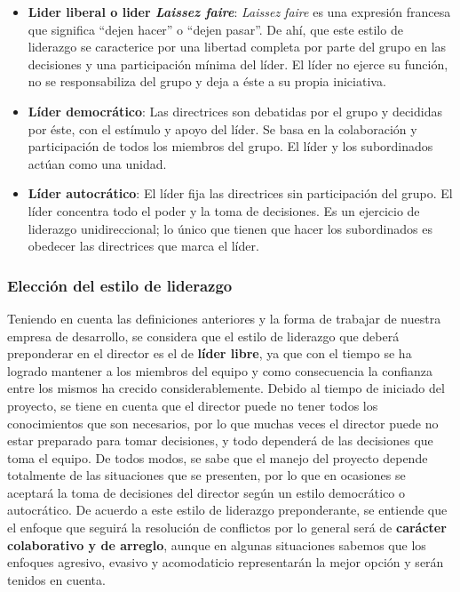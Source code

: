 \begin{itemize}
\item\textbf{Lider liberal o lider \textit{Laissez faire}}:
\textit{Laissez faire} es una expresión francesa que significa ``dejen hacer'' o ``dejen pasar''.
De ahí, que este estilo de liderazgo se caracterice por una libertad completa por parte del grupo en las decisiones y una participación mínima del líder.
El líder no ejerce su función, no se responsabiliza del grupo y deja a éste a su propia iniciativa.

\item\textbf{Líder democrático}:
Las directrices son debatidas por el grupo y decididas por éste, con el estímulo y apoyo del líder.
Se basa en la colaboración y participación de todos los miembros del grupo.
El líder y los subordinados actúan como una unidad.

\item\textbf{Líder autocrático}:
El líder fija las directrices sin participación del grupo.
El líder concentra todo el poder y la toma de decisiones.
Es un ejercicio de liderazgo unidireccional; lo único que tienen que hacer los subordinados es obedecer las directrices que marca el líder.
\end{itemize}

\subsubsection{Elección del estilo de liderazgo}

Teniendo en cuenta las definiciones anteriores y la forma de trabajar de nuestra empresa de desarrollo, se considera que el estilo de liderazgo que deberá preponderar en el director es el de \textbf{líder libre}, ya que con el tiempo se ha logrado mantener a los miembros del equipo y como consecuencia la confianza entre los mismos ha crecido considerablemente.
Debido al tiempo de iniciado del proyecto, se tiene en cuenta que el director puede no tener todos los conocimientos que son necesarios, por lo que muchas veces el director puede no estar preparado para tomar decisiones, y todo dependerá de las decisiones que toma el equipo.
De todos modos, se sabe que el manejo del proyecto depende totalmente de las situaciones que se presenten, por lo que en ocasiones se aceptará la toma de decisiones del director según un estilo democrático o autocrático.
De acuerdo a este estilo de liderazgo preponderante, se entiende que el enfoque que seguirá la resolución de conflictos por lo general será de \textbf{carácter colaborativo y de arreglo}, aunque en algunas situaciones sabemos que los enfoques agresivo, evasivo y acomodaticio representarán la mejor opción y serán tenidos en cuenta. 


